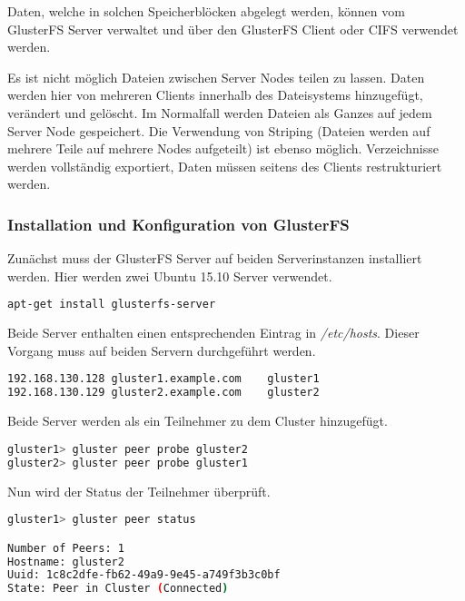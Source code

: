 Daten, welche in solchen Speicherblöcken abgelegt werden, können vom GlusterFS Server verwaltet und über den GlusterFS Client oder CIFS verwendet werden.

Es ist nicht möglich Dateien zwischen Server Nodes teilen zu lassen. Daten werden hier von mehreren Clients innerhalb des Dateisystems hinzugefügt, verändert und gelöscht. Im Normalfall werden Dateien als Ganzes auf jedem Server Node gespeichert. Die Verwendung von Striping (Dateien werden auf mehrere Teile auf mehrere Nodes aufgeteilt) ist ebenso möglich. Verzeichnisse werden vollständig exportiert, Daten müssen seitens des Clients restrukturiert werden. \cite{glusterabout, glusterwiki}


\subsubsection{Installation und Konfiguration von GlusterFS \cite{glusterserverinstall, glusterclientinstall}}
\label{subsubsec:Installation und Konfiguration von GlusterFS}
Zunächst muss der GlusterFS Server auf beiden Serverinstanzen installiert werden. Hier werden zwei Ubuntu 15.10 Server verwendet.
\begin{lstlisting}[language=bash, caption=Installation des GlusterFS Servers]
apt-get install glusterfs-server
\end{lstlisting}

Beide Server enthalten einen entsprechenden Eintrag in \textit{/etc/hosts}. Dieser Vorgang muss auf beiden Servern durchgeführt werden.
\begin{lstlisting}[language=bash, caption=Vorbereiten von /etc/hosts]
192.168.130.128	gluster1.example.com	gluster1
192.168.130.129	gluster2.example.com	gluster2
\end{lstlisting}

Beide Server werden als ein Teilnehmer zu dem Cluster hinzugefügt.
\begin{lstlisting}[language=bash, caption=Hinzufügen der Server zum Cluster]
gluster1> gluster peer probe gluster2
gluster2> gluster peer probe gluster1
\end{lstlisting}

Nun wird der Status der Teilnehmer überprüft.
\begin{lstlisting}[language=bash, caption=Überprüfen des Status der Teilnehmer]
gluster1> gluster peer status

Number of Peers: 1
Hostname: gluster2
Uuid: 1c8c2dfe-fb62-49a9-9e45-a749f3b3c0bf
State: Peer in Cluster (Connected)
\end{lstlisting}


